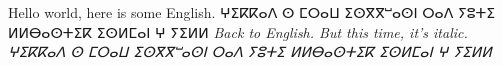 \documentclass{book}
\begin{document}
Hello world, here is some English. {\TI ⵖⵉⴽⴽⴰⴷ ⵙ ⵎⵔⴰⵡ ⵉⵙⴳⴳⵯⴰⵙⵏ ⵔⴰⴷ
  ⵢⵓⵜⵉ ⵍⵍⴱⴰⵙⵜⵉⴽ ⵉⵙⵍⵎⴰⵏ ⵖ ⵢⵉⵍⵍ} \textit{Back to English. But this
  time, it's italic.} \textit{{\TI ⵖⵉⴽⴽⴰⴷ ⵙ ⵎⵔⴰⵡ ⵉⵙⴳⴳⵯⴰⵙⵏ ⵔⴰⴷ ⵢⵓⵜⵉ
    ⵍⵍⴱⴰⵙⵜⵉⴽ ⵉⵙⵍⵎⴰⵏ ⵖ ⵢⵉⵍⵍ}}
\end{document}
